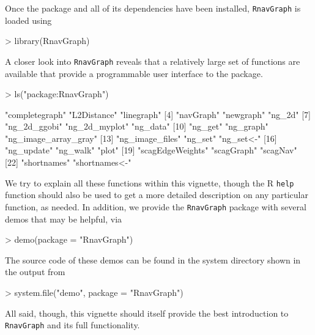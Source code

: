 \documentclass[12pt,oneside,titlepage,letter]{article}
\begin{document}
Once the package and all of its dependencies have been installed,  \texttt{RnavGraph} is loaded using
\begin{Schunk}
\begin{Sinput}
> library(RnavGraph)
\end{Sinput}
\end{Schunk}
A closer look into \texttt{RnavGraph} reveals that a relatively large set of functions are available that provide a programmable user interface to the package.
\begin{Schunk}
\begin{Sinput}
> ls("package:RnavGraph")
\end{Sinput}
\begin{Soutput}
 [1] "completegraph"       "L2Distance"          "linegraph"          
 [4] "navGraph"            "newgraph"            "ng_2d"              
 [7] "ng_2d_ggobi"         "ng_2d_myplot"        "ng_data"            
[10] "ng_get"              "ng_graph"            "ng_image_array_gray"
[13] "ng_image_files"      "ng_set"              "ng_set<-"           
[16] "ng_update"           "ng_walk"             "plot"               
[19] "scagEdgeWeights"     "scagGraph"           "scagNav"            
[22] "shortnames"          "shortnames<-"       
\end{Soutput}
\end{Schunk}

We try to explain all these functions within this vignette, though the R \texttt{help} function should also be used to get a more detailed description on any particular function, as needed. 
In addition, we provide the \texttt{RnavGraph} package with several demos that may be helpful, via
\begin{Schunk}
\begin{Sinput}
> demo(package = "RnavGraph")
\end{Sinput}
\end{Schunk}
The source code of these demos can be found in the system directory shown in the output from
\begin{Schunk}
\begin{Sinput}
> system.file("demo", package = "RnavGraph")
\end{Sinput}
\end{Schunk}

All said, though, this vignette should itself provide the best introduction to \texttt{RnavGraph} and its full functionality.
\end{document}
